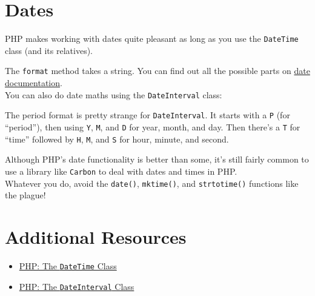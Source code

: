\section{Dates}

PHP makes working with dates quite pleasant as long as you use the \texttt{DateTime} class (and its relatives).


The \texttt{format} method takes a string. You can find out all the possible parts on \href{http://www.php.net/manual/en/function.date.php}{date documentation}.
\\

You can also do date maths using the \texttt{DateInterval} class:


The period format is pretty strange for \texttt{DateInterval}. It starts with a \texttt{P} (for ``period''), then using \texttt{Y}, \texttt{M}, and \texttt{D} for year, month, and day. Then there's a \texttt{T} for ``time'' followed by \texttt{H}, \texttt{M}, and \texttt{S} for hour, minute, and second.

\hr

Although PHP's date functionality is better than some, it's still fairly common to use a library like \texttt{Carbon} to deal with dates and times in PHP.
\\

Whatever you do, avoid the \texttt{date()}, \texttt{mktime()}, and \texttt{strtotime()} functions like the plague!

\section{Additional Resources}

\begin{itemize}[leftmargin=*]
    \item \href{http://www.php.net/manual/en/class.datetime.php}{PHP: The \texttt{DateTime} Class}
    \item \href{http://www.php.net/manual/en/class.dateinterval.php}{PHP: The \texttt{DateInterval} Class}
\end{itemize}
